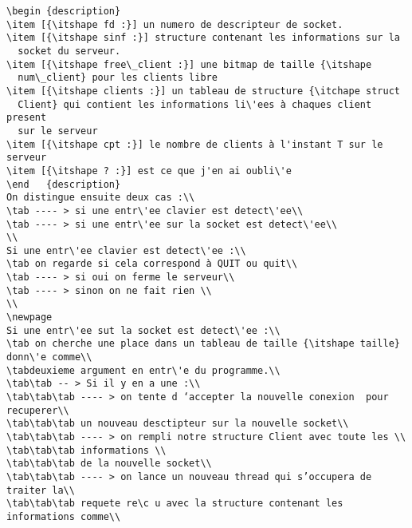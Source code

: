 \documentclass[final,twoside,onecolumn,10pt]{article}
\newcommand\tab[1][1cm]{\hspace*{#1}}
\begin{document}
\begin {verbatim}
\begin {description}
\item [{\itshape fd :}] un numero de descripteur de socket.
\item [{\itshape sinf :}] structure contenant les informations sur la
  socket du serveur.
\item [{\itshape free\_client :}] une bitmap de taille {\itshape
  num\_client} pour les clients libre
\item [{\itshape clients :}] un tableau de structure {\itchape struct
  Client} qui contient les informations li\'ees à chaques client present
  sur le serveur
\item [{\itshape cpt :}] le nombre de clients à l'instant T sur le serveur
\item [{\itshape ? :}] est ce que j'en ai oubli\'e
\end   {description}
On distingue ensuite deux cas :\\
\tab ---- > si une entr\'ee clavier est detect\'ee\\
\tab ---- > si une entr\'ee sur la socket est detect\'ee\\
\\
Si une entr\'ee clavier est detect\'ee :\\
\tab on regarde si cela correspond à QUIT ou quit\\ 
\tab ---- > si oui on ferme le serveur\\
\tab ---- > sinon on ne fait rien \\
\\
\newpage
Si une entr\'ee sut la socket est detect\'ee :\\
\tab on cherche une place dans un tableau de taille {\itshape taille}
donn\'e comme\\
\tabdeuxieme argument en entr\'e du programme.\\
\tab\tab -- > Si il y en a une :\\
\tab\tab\tab ---- > on tente d ‘accepter la nouvelle conexion  pour recuperer\\ 
\tab\tab\tab un nouveau desctipteur sur la nouvelle socket\\
\tab\tab\tab ---- > on rempli notre structure Client avec toute les \\
\tab\tab\tab informations \\
\tab\tab\tab de la nouvelle socket\\
\tab\tab\tab ---- > on lance un nouveau thread qui s’occupera de traiter la\\
\tab\tab\tab requete re\c u avec la structure contenant les informations comme\\

\end{verbatim}
\end{document}
